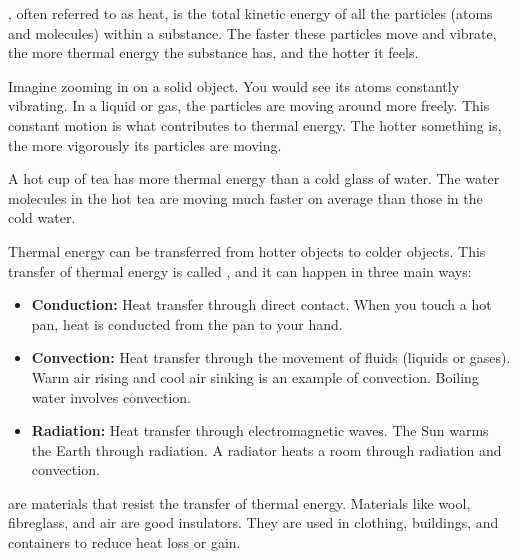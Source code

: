 , often referred to as heat, is the total kinetic energy of all the particles (atoms and molecules) within a substance. The faster these particles move and vibrate, the more thermal energy the substance has, and the hotter it feels.


Imagine zooming in on a solid object. You would see its atoms constantly vibrating. In a liquid or gas, the particles are moving around more freely. This constant motion is what contributes to thermal energy.  The hotter something is, the more vigorously its particles are moving.

\begin{example}
A hot cup of tea has more thermal energy than a cold glass of water. The water molecules in the hot tea are moving much faster on average than those in the cold water.
\end{example}

Thermal energy can be transferred from hotter objects to colder objects. This transfer of thermal energy is called , and it can happen in three main ways:

\begin{itemize}
    \item \textbf{Conduction:} Heat transfer through direct contact.  When you touch a hot pan, heat is conducted from the pan to your hand.
    \item \textbf{Convection:} Heat transfer through the movement of fluids (liquids or gases).  Warm air rising and cool air sinking is an example of convection.  Boiling water involves convection.
    \item \textbf{Radiation:} Heat transfer through electromagnetic waves.  The Sun warms the Earth through radiation.  A radiator heats a room through radiation and convection.
\end{itemize}

\begin{marginnote}
 are materials that resist the transfer of thermal energy.  Materials like wool, fibreglass, and air are good insulators.  They are used in clothing, buildings, and containers to reduce heat loss or gain.
\end{marginnote}

